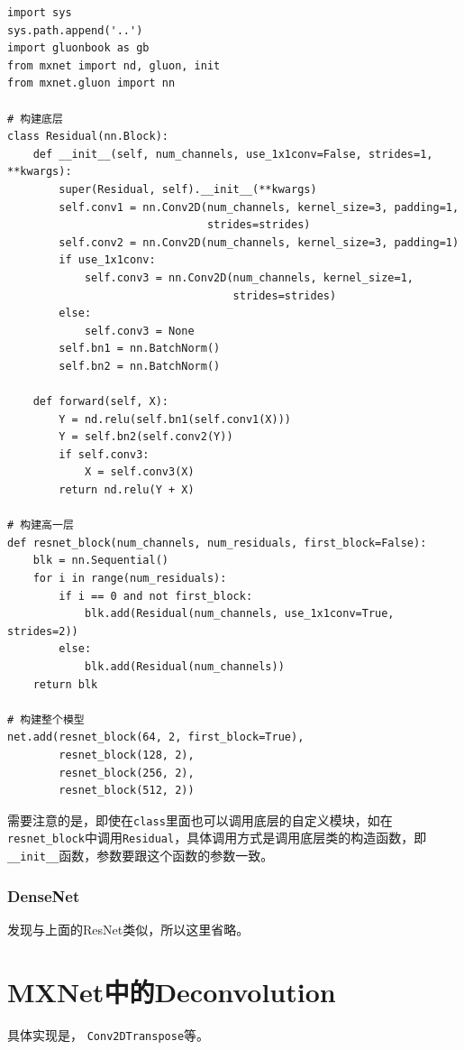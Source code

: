 \begin{lstlisting}
import sys
sys.path.append('..')
import gluonbook as gb
from mxnet import nd, gluon, init
from mxnet.gluon import nn

# 构建底层
class Residual(nn.Block):
    def __init__(self, num_channels, use_1x1conv=False, strides=1, **kwargs):
        super(Residual, self).__init__(**kwargs)
        self.conv1 = nn.Conv2D(num_channels, kernel_size=3, padding=1,
                               strides=strides)
        self.conv2 = nn.Conv2D(num_channels, kernel_size=3, padding=1)
        if use_1x1conv:
            self.conv3 = nn.Conv2D(num_channels, kernel_size=1,
                                   strides=strides)
        else:
            self.conv3 = None
        self.bn1 = nn.BatchNorm()
        self.bn2 = nn.BatchNorm()

    def forward(self, X):
        Y = nd.relu(self.bn1(self.conv1(X)))
        Y = self.bn2(self.conv2(Y))
        if self.conv3:
            X = self.conv3(X)
        return nd.relu(Y + X)

# 构建高一层        
def resnet_block(num_channels, num_residuals, first_block=False):
    blk = nn.Sequential()
    for i in range(num_residuals):
        if i == 0 and not first_block:
            blk.add(Residual(num_channels, use_1x1conv=True, strides=2))
        else:
            blk.add(Residual(num_channels))
    return blk
    
# 构建整个模型
net.add(resnet_block(64, 2, first_block=True),
        resnet_block(128, 2),
        resnet_block(256, 2),
        resnet_block(512, 2))        
\end{lstlisting}

需要注意的是，即使在\verb|class|里面也可以调用底层的自定义模块，如在\verb|resnet_block|中调用\verb|Residual|，具体调用方式是调用底层类的构造函数，即\verb|__init__|函数，参数要跟这个函数的参数一致。

\subsubsection{DenseNet}

发现与上面的ResNet类似，所以这里省略。

\section{MXNet中的Deconvolution}

具体实现是， \verb|Conv2DTranspose|等。

